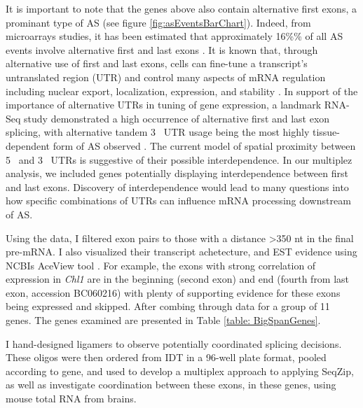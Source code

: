   It is important to note that the genes above also contain alternative first exons, a prominant type of AS (see figure \ref{fig:asEventsBarChart}). Indeed, from microarrays studies, it has been estimated that approximately 16\%\% of all AS events involve alternative first and last exons \citep{Bingham2008}. It is known that, through alternative use of first and last exons, cells can fine-tune a transcript’s untranslated region (UTR) and control many aspects of mRNA regulation including nuclear export, localization, expression, and stability \citep{Hughes2006}. In support of the importance of alternative UTRs in tuning of gene expression, a landmark RNA-Seq study demonstrated a high occurrence of alternative first and last exon splicing, with alternative tandem 3\textprime~ UTR usage being the most highly tissue-dependent form of AS observed \citep{Wang2008}. The current model of spatial proximity between 5\textprime~ and 3\textprime~ UTRs is suggestive of their possible interdependence. In our multiplez analysis, we included genes potentially displaying interdependence between first and last exons. Discovery of interdependence would lead to many questions into how specific combinations of UTRs can influence mRNA processing downstream of AS.

  Using the \citet{Fagnani2007} data, I filtered exon pairs to those with a distance >350 nt in the final pre-mRNA. I also visualized their transcript achetecture, and EST evidence using NCBIs AceView tool \citep{Thierry-Mieg2006}. For example, the exons with strong correlation of expression in \textit{Chl1} are in the beginning (second exon) and end (fourth from last exon, accession BC060216) with plenty of supporting evidence for these exons being expressed and skipped. After combing through \citep{Fagnani2007} data for a group of 11 genes. The genes examined are presented in Table \ref{table: BigSpanGenes}.

  

  I hand-designed ligamers to observe potentially coordinated splicing decisions. These oligos were then ordered from IDT in a 96-well plate format, pooled according to gene, and used to develop a multiplex approach to applying SeqZip, as well as investigate coordination between these exons, in these genes, using mouse total RNA from brains.


